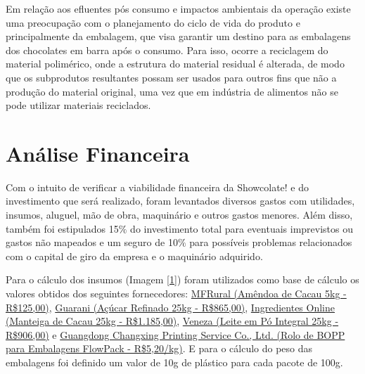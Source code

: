 \documentclass[
	12pt,				%
	openright,			%
	oneside,			%
	a4paper,			%
	english,			%
	french,				%
	spanish,			%
	brazil				%
	]{abntex2}
\begin{document}
Em relação aos efluentes pós consumo e impactos ambientais da operação existe uma preocupação com o planejamento do ciclo de vida do produto e principalmente da embalagem, que visa garantir um destino para as embalagens dos chocolates em barra após o consumo. Para isso, ocorre a reciclagem do material polimérico, onde a estrutura do material residual é alterada, de modo que os subprodutos resultantes possam ser usados para outros fins que não a produção do material original, uma vez que em indústria de alimentos não se pode utilizar materiais reciclados.

\chapter{Análise Financeira}

Com o intuito de verificar a viabilidade financeira da Showcolate! e do investimento que será realizado, foram levantados diversos gastos com utilidades, insumos, aluguel, mão de obra, maquinário e outros gastos menores. Além disso, também foi estipulados 15$\%$ do investimento total para eventuais imprevistos ou gastos não mapeados e um seguro de 10$\%$ para possíveis problemas relacionados com o capital de giro da empresa e o maquinário adquirido.

Para o cálculo dos insumos (Imagem \ref{1}) foram utilizados como base de cálculo os valores obtidos dos seguintes fornecedores: \href{https://www.mfrural.com.br/detalhe/185844/amendoa-do-cacau-inteira}{MFRural (Amêndoa de Cacau 5kg - R\$125,00)}, \href{https://www.aguarani.com.br/acucar-refinado---saco-de-25-kg-36826724}{Guarani (Açúcar Refinado 25kg - R\$865,00)}, \href{https://www.ingredientesonline.com.br/manteiga-de-cacau?utm_source=google&https://www.ingredientesonline.com.br/https://www.ingredientesonline.com.bhttps://www.ingredientesonline.com.br/?utm_source=google&utm_medium=cpc&utm_campaign=geral&utm_term=keywords&utm_content=google_shopping_io_b2c_keywords_brasil_geral_produto_produto_feed_produtos_roas4#volume=5672}{Ingredientes Online (Manteiga de Cacau 25kg - R\$1.185,00)}, \href{https://feijaoveneza.com.br/leite-em-po-integral-25-kg-saco}{Veneza (Leite em Pó Integral 25kg - R\$906,00)} e \href{https://pt.made-in-china.com/co_cx-pack/product_Custom-Print-Automatic-Sachet-Packaging-Roll-Film-Food-Plastic-Laminated-Aluminum-Foil-Bags-Print-Rolls_uoossrhseg.html}{Guangdong Changxing Printing Service Co., Ltd. (Rolo de BOPP para Embalagens FlowPack - R\$5,20/kg)}. E para o cálculo do peso das embalagens foi definido um valor de 10g de plástico para cada pacote de 100g. 
\end{document}

